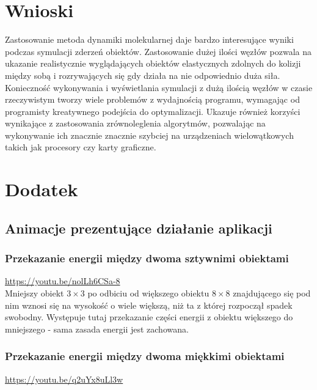 \documentclass[12pt, letterpaper]{report}
\begin{document}
    \section{Wnioski}
    Zastosowanie metoda dynamiki molekularnej daje bardzo interesujące 
    wyniki podczas symulacji zderzeń obiektów. Zastosowanie dużej ilości węzłów pozwala na 
    ukazanie realistycznie wyglądających obiektów elastycznych zdolnych do kolizji między sobą 
    i rozrywających się gdy działa na nie odpowiednio duża siła. \\
    
    Konieczność wykonywania i wyświetlania symulacji z dużą ilością węzłów w czasie 
    rzeczywistym tworzy wiele problemów z wydajnością programu, wymagając
    od programisty kreatywnego podejścia do optymalizacji. Ukazuje również korzyści wynikające z 
    zastosowania zrównoleglenia algorytmów, pozwalając na wykonywanie ich znacznie znacznie szybciej na 
    urządzeniach wielowątkowych takich jak procesory czy karty graficzne.

    \section{Dodatek}
    \subsection{Animacje prezentujące działanie aplikacji}
    
    \subsubsection{Przekazanie energii między dwoma sztywnimi obiektami}
    \url{https://youtu.be/nolLh6CSa-8} \\

    Mniejszy obiekt $3 \times 3$ po odbiciu od większego obiektu $8 \times  8$ 
    znajdującego się  pod nim wznosi się na
    wysokość o wiele większą, niż ta z której rozpoczął spadek swobodny.
    Występuje tutaj przekazanie części energii z obiektu 
    większego do mniejszego - sama zasada energii jest zachowana.

    \subsubsection{Przekazanie energii między dwoma miękkimi obiektami}
    \url{https://youtu.be/q2uYx8uLl3w} \\
\end{document}
